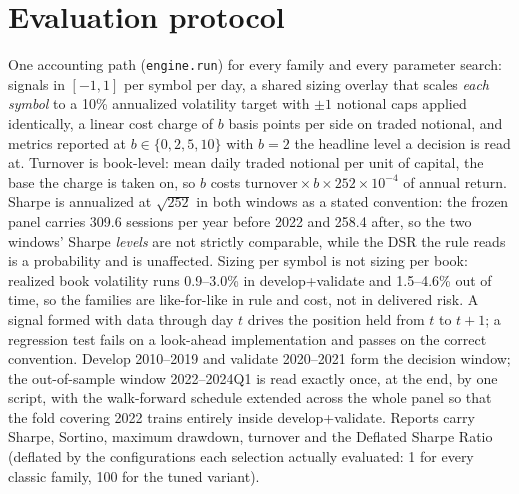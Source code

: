 \documentclass[11pt,a4paper]{article}
\begin{document}
\section{Evaluation protocol}
One accounting path (\texttt{engine.run}) for every family and every parameter search: signals in
$[-1,1]$ per symbol per day, a shared sizing overlay that scales \emph{each symbol} to a 10\% annualized
volatility target with $\pm1$ notional caps applied identically, a linear cost charge of $b$ basis points
per side on traded notional, and metrics reported at $b \in \{0,2,5,10\}$ with $b=2$ the headline level a
decision is read at. Turnover is book-level: mean daily traded notional per unit of capital, the base
the charge is taken on, so $b$ costs $\text{turnover} \times b \times 252 \times 10^{-4}$ of annual
return. Sharpe is annualized at $\sqrt{252}$ in both windows as a stated convention: the frozen panel
carries 309.6 sessions per year before 2022 and 258.4 after, so the two windows' Sharpe \emph{levels} are
not strictly comparable, while the DSR the rule reads is a probability and is unaffected. Sizing per
symbol is not sizing per book: realized book volatility runs 0.9--3.0\% in develop+validate and
1.5--4.6\% out of time, so the families are like-for-like in rule and cost, not in delivered risk.
A signal formed with data through day $t$ drives the position held from $t$ to $t+1$; a regression test
fails on a look-ahead implementation and passes on the correct convention. Develop 2010--2019 and
validate 2020--2021 form the decision window; the out-of-sample window 2022--2024Q1 is read exactly
once, at the end, by one script, with the walk-forward schedule extended across the whole panel so
that the fold covering 2022 trains entirely inside develop+validate. Reports carry Sharpe, Sortino,
maximum drawdown, turnover and the Deflated Sharpe Ratio (deflated by the configurations each
selection actually evaluated: 1 for every classic family, 100 for the tuned variant).
\end{document}
